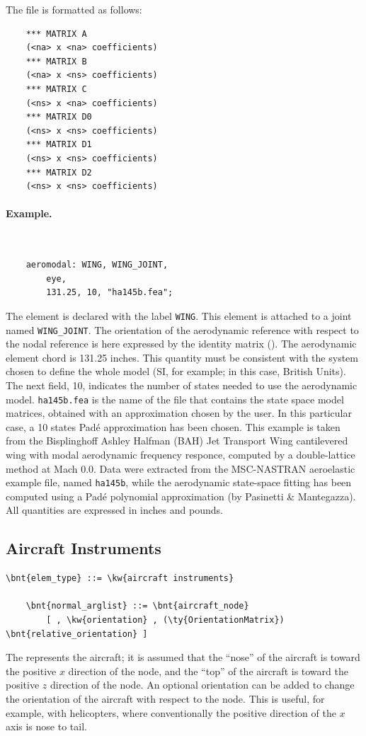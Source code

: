 The file is formatted as follows:
\begin{verbatim}
    *** MATRIX A
    (<na> x <na> coefficients)
    *** MATRIX B
    (<na> x <ns> coefficients)
    *** MATRIX C
    (<ns> x <na> coefficients)
    *** MATRIX D0
    (<ns> x <ns> coefficients)
    *** MATRIX D1
    (<ns> x <ns> coefficients)
    *** MATRIX D2
    (<ns> x <ns> coefficients)
\end{verbatim}

\paragraph{Example.} \
\begin{verbatim}
    aeromodal: WING, WING_JOINT,
        eye,
        131.25, 10, "ha145b.fea";
\end{verbatim}
The  element is declared with the label \texttt{WING}.
This element is attached to a \kw{modal} joint 
named \texttt{WING\_JOINT}.
The orientation of the aerodynamic reference with respect 
to the nodal reference is here expressed by the identity matrix ().
The aerodynamic element chord is 131.25 inches.
This quantity must be consistent with the system chosen to define 
the whole model (SI, for example; in this case, British Units).
The next field, 10, indicates the number of states needed to use 
the aerodynamic model.
\texttt{ha145b.fea} is the name of the file that contains
the state space model matrices, obtained with an approximation 
chosen by the user.
In this particular case, a 10 states Pad\'e approximation 
has been chosen.
This example is taken from the Bisplinghoff Ashley Halfman
(BAH) Jet Transport Wing cantilevered wing with modal aerodynamic 
frequency responce, computed by a double-lattice method at Mach 0.0.
Data were extracted from the MSC-NASTRAN aeroelastic example file, 
named \texttt{ha145b}, while the aerodynamic state-space fitting 
has been computed using a Pad\'e polynomial approximation
(by Pasinetti \& Mantegazza).
All quantities are expressed in inches and pounds.



\subsection{Aircraft Instruments}
\begin{Verbatim}[commandchars=\\\{\}]
    \bnt{elem_type} ::= \kw{aircraft instruments}

    \bnt{normal_arglist} ::= \bnt{aircraft_node}
        [ , \kw{orientation} , (\ty{OrientationMatrix}) \bnt{relative_orientation} ]
\end{Verbatim}
The  represents the aircraft; it is assumed
that the ``nose'' of the aircraft is toward the positive $x$ direction
of the node, and the ``top'' of the aircraft is toward the positive 
$z$ direction of the node.
An optional orientation can be added to change the orientation 
of the aircraft with respect to the node.
This is useful, for example, with helicopters, where conventionally
the positive direction of the $x$ axis is nose to tail.


